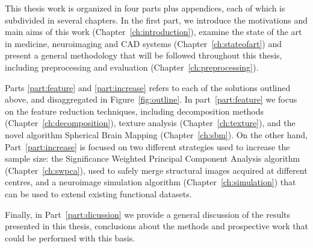 This thesis work is organized in four parts plus appendices, each of which is subdivided in several chapters. In the first part, we introduce the motivations and main aims of this work (Chapter~\ref{ch:introduction}), examine the state of the art in medicine, neuroimaging and \ac{CAD} systems (Chapter~\ref{ch:stateofart}) and present a general methodology that will be followed throughout this thesis, including preprocessing and evaluation (Chapter~\ref{ch:preprocessing}). 

Parts \ref{part:feature} and \ref{part:increase} refers to each of the solutions outlined above, and disaggregated in Figure~\ref{fig:outline}. In part~\ref{part:feature} we focus on the feature reduction techniques, including decomposition methods (Chapter~\ref{ch:decomposition}), texture analysis (Chapter~\ref{ch:texture}), and the novel algorithm Spherical Brain Mapping (Chapter~\ref{ch:sbm}). On the other hand, Part~\ref{part:increase} is focused on two different strategies used to increase the sample size: the Significance Weighted Principal Component Analysis algorithm (Chapter~\ref{ch:swpca}), used to safely merge structural images acquired at different centres, and a neuroimage simulation algorithm (Chapter~\ref{ch:simulation}) that can be used to extend existing functional datasets. 

Finally, in Part~\ref{part:dicussion} we provide a general discussion of the results presented in this thesis, conclusions about the methods and prospective work that could be performed with this basis. 
